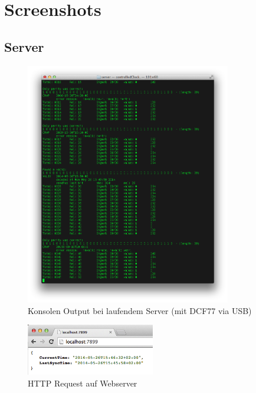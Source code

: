 \newpage
\section{Screenshots}

\subsection{Server}

\begin{figure}[htbp!]
	\caption{Konsolen Output bei laufendem Server (mit DCF77 via USB)}
	\centering
		\includegraphics[width=0.8\textwidth]{./images/screenshots/server_console_output.png}
\end{figure}

\begin{figure}[htbp!]
	\caption{HTTP Request auf Webserver}
	\centering
		\includegraphics[width=0.5\textwidth]{./images/screenshots/server_webresponse.png}
\end{figure}

\newpage

